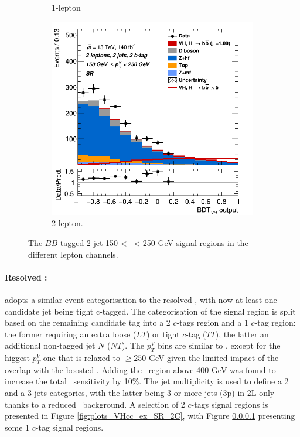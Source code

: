 \begin{figure}[h!]
\begin{subfigure}[b]{0.32\textwidth}
      \caption{1-lepton}
      \label{fig:plots_VHbb_ex_1L_SR}
  \end{subfigure}
  \begin{subfigure}[b]{0.32\textwidth}
    \centering
    \includegraphics[width=\textwidth]{Images/VH/Own_fit/prefit_VHbb/Region_distmva_BMax250_BMin150_DSR_J2_TTypebb_T2_L2_Y6051_Prefit.png}
    \caption{2-lepton.}
    \label{fig:plots_VHbb_ex_2L_SR}
\end{subfigure}
  \caption{The $BB$-tagged 2-jet 150 < \ptv\ < 250 GeV signal regions in the different lepton channels.}
  \label{fig:plots_VHbb_ex_SR}
\end{figure} 


\paragraph{Resolved \vhc:} adopts a similar event categorisation to the resolved \vhb, with now at least one candidate jet being tight c-tagged. The categorisation of the signal region is split based on the remaining candidate tag into a 2 $c$-tags region and a 1 $c$-tag region: the former requiring an extra loose ($LT$) or tight $c$-tag ($TT$), the latter an additional non-tagged jet $N$ ($NT$). The $p_T^V$ bins are similar to \vhb, except for the higgest $p_T^V$ one that is relaxed to $\geq 250$ GeV given the limited impact of the overlap with the boosted \vhb. Adding the \ptv\ region above 400 GeV was found to increase the total \vhc\ sensitivity by 10\%. The jet multiplicity is used to define a 2 and a 3 jets categories, with the latter being 3 or more jets (3p) in 2L only thanks to a reduced \ttb\ background. A selection of 2 $c$-tags signal regions is presented in Figure \ref{fig:plots_VHcc_ex_SR_2C}, with Figure \ref{} presenting some 1 $c$-tag signal regions.

